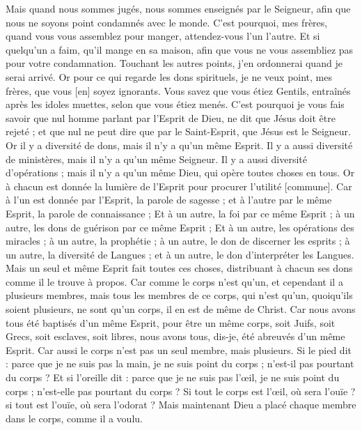 \begin{multicols}{2}
Mais quand nous sommes jugés, nous sommes enseignés par le Seigneur, afin que nous ne soyons point condamnés avec le monde.
C'est pourquoi, mes frères, quand vous vous assemblez pour manger, attendez-vous l'un l'autre.
Et si quelqu'un a faim, qu'il mange en sa maison, afin que vous ne vous assembliez pas pour votre condamnation. Touchant les autres points, j'en ordonnerai quand je serai arrivé.
\VerseOne{}Or pour ce qui regarde les dons spirituels, je ne veux point, mes frères, que vous [en] soyez ignorants.
Vous savez que vous étiez Gentils, entraînés après les idoles muettes, selon que vous étiez menés.
C'est pourquoi je vous fais savoir que nul homme parlant par l'Esprit de Dieu, ne dit que Jésus doit être rejeté ; et que nul ne peut dire que par le Saint-Esprit, que Jésus est le Seigneur.
Or il y a diversité de dons, mais il n'y a qu'un même Esprit.
Il y a aussi diversité de ministères, mais il n'y a qu'un même Seigneur.
Il y a aussi diversité d'opérations ; mais il n'y a qu'un même Dieu, qui opère toutes choses en tous.
Or à chacun est donnée la lumière de l'Esprit pour procurer l'utilité [commune].
Car à l'un est donnée par l'Esprit, la parole de sagesse ; et à l'autre par le même Esprit, la parole de connaissance ;
Et à un autre, la foi par ce même Esprit ; à un autre, les dons de guérison par ce même Esprit ;
Et à un autre, les opérations des miracles ; à un autre, la prophétie ; à un autre, le don de discerner les esprits ; à un autre, la diversité de Langues ; et à un autre, le don d'interpréter les Langues.
Mais un seul et même Esprit fait toutes ces choses, distribuant à chacun ses dons comme il le trouve à propos.
Car comme le corps n'est qu'un, et cependant il a plusieurs membres, mais tous les membres de ce corps, qui n'est qu'un, quoiqu'ils soient plusieurs, ne sont qu'un corps, il en est de même de Christ.
Car nous avons tous été baptisés d'un même Esprit, pour être un même corps, soit Juifs, soit Grecs, soit esclaves, soit libres, nous avons tous, dis-je, été abreuvés d'un même Esprit.
Car aussi le corps n'est pas un seul membre, mais plusieurs.
Si le pied dit : parce que je ne suis pas la main, je ne suis point du corps ; n'est-il pas pourtant du corps ?
Et si l'oreille dit : parce que je ne suis pas l'œil, je ne suis point du corps ; n'est-elle pas pourtant du corps ?
Si tout le corps est l'œil, où sera l'ouïe ? si tout est l'ouïe, où sera l'odorat ?
Mais maintenant Dieu a placé chaque membre dans le corps, comme il a voulu.

\end{multicols}
